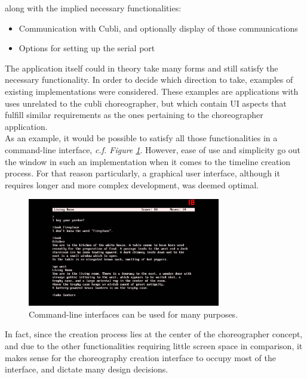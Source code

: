 along with the implied necessary functionalities:

\begin{itemize}
\item Communication with Cubli, and optionally display of those communications
\item Options for setting up the serial port
\end{itemize}


The application itself could in theory take many forms and still satisfy the necessary functionality. In order to decide which direction to take, examples of existing implementations were considered. These examples are applications with uses unrelated to the cubli choreographer, but which contain UI aspects that fulfill similar requirements as the ones pertaining to the choreographer application.\\

As an example, it would be possible to satisfy all those functionalities in a command-line interface, \textit{c.f. Figure \ref{img:CommandLine}}. However, ease of use and simplicity go out the window in such an implementation when it comes to the timeline creation process. For that reason particularly, a graphical user interface, although it requires longer and more complex development, was deemed optimal.\\

\begin{figure}[ht]
   \centering
   \includegraphics[width=0.75\textwidth]{img/CommandLine.jpg}
   \caption{Command-line interfaces can be used for many purposes.}
   \label{img:CommandLine}
\end{figure}

In fact, since the creation process lies at the center of the choreographer concept, and due to the other functionalities requiring little screen space in comparison, it makes sense for the choreography creation interface to occupy most of the interface, and dictate many design decisions.\\

